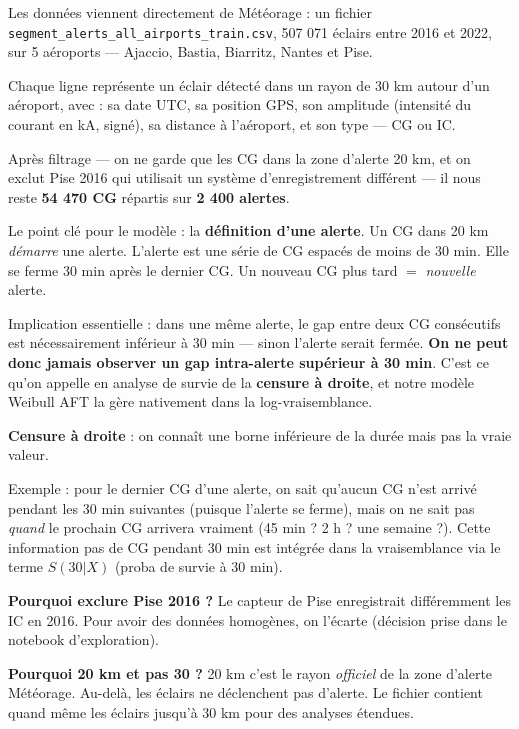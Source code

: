\documentclass[11pt,a4paper]{article}
\begin{document}
\begin{dire}
\og Les données viennent directement de Météorage : un fichier
\texttt{segment\_alerts\_all\_airports\_train.csv}, 507 071 éclairs entre 2016 et 2022,
sur 5 aéroports — Ajaccio, Bastia, Biarritz, Nantes et Pise.

Chaque ligne représente un éclair détecté dans un rayon de 30 km autour d'un aéroport,
avec : sa date UTC, sa position GPS, son amplitude (intensité du courant en kA, signé),
sa distance à l'aéroport, et son type — CG ou IC.

Après filtrage — on ne garde que les CG dans la zone d'alerte 20 km, et on exclut Pise
2016 qui utilisait un système d'enregistrement différent — il nous reste
\textbf{54 470 CG} répartis sur \textbf{2 400 alertes}.

Le point clé pour le modèle : la \textbf{définition d'une alerte}. Un CG dans 20 km
\emph{démarre} une alerte. L'alerte est une série de CG espacés de moins de 30 min.
Elle se ferme 30 min après le dernier CG. Un nouveau CG plus tard $=$ \emph{nouvelle}
alerte.

Implication essentielle : dans une même alerte, le gap entre deux CG consécutifs est
nécessairement inférieur à 30 min — sinon l'alerte serait fermée. \textbf{On ne peut donc
jamais observer un gap intra-alerte supérieur à 30 min}. C'est ce qu'on appelle en analyse
de survie de la \textbf{censure à droite}, et notre modèle Weibull AFT la gère nativement
dans la log-vraisemblance. \fg{}
\end{dire}

\begin{compr}
\textbf{Censure à droite} : on connaît une borne inférieure de la durée mais pas la vraie
valeur.

Exemple : pour le dernier CG d'une alerte, on sait qu'aucun CG n'est arrivé pendant les
30 min suivantes (puisque l'alerte se ferme), mais on ne sait pas \emph{quand} le prochain
CG arrivera vraiment (45 min ? 2 h ? une semaine ?). Cette information \og pas de CG pendant
30 min \fg{} est intégrée dans la vraisemblance via le terme $S(30 | X)$ (proba de survie
à 30 min).

\textbf{Pourquoi exclure Pise 2016 ?} Le capteur de Pise enregistrait différemment les IC
en 2016. Pour avoir des données homogènes, on l'écarte (décision prise dans le notebook
d'exploration).

\textbf{Pourquoi 20 km et pas 30 ?} 20 km c'est le rayon \emph{officiel} de la zone d'alerte
Météorage. Au-delà, les éclairs ne déclenchent pas d'alerte. Le fichier contient quand
même les éclairs jusqu'à 30 km pour des analyses étendues.
\end{compr}
\end{document}
